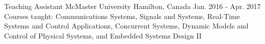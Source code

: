 

\begin{cventries}

  \cventry
    {Teaching Assistant} %
    {McMaster University} %
    {Hamilton, Canada} %
    {Jan. 2016 - Apr. 2017} %
    {Courses taught: Communications Systems, Signals and Systems, Real-Time Systems and Control Applications, Concurrent Systems, Dynamic Models and Control of Physical Systems, and Embedded Systems Design II
    }



\end{cventries}
